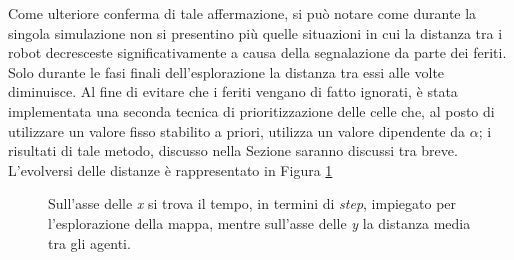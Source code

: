 Come ulteriore conferma di tale affermazione, si può notare come durante la singola simulazione non si presentino più quelle situazioni in cui la distanza tra i robot decresceste significativamente a causa della segnalazione da parte dei feriti. Solo durante le fasi finali dell'esplorazione la distanza tra essi alle volte diminuisce.
Al fine di evitare che i feriti vengano di fatto ignorati, è stata implementata una seconda tecnica di prioritizzazione delle celle che, al posto di utilizzare un valore fisso stabilito a priori, utilizza un valore dipendente da $\alpha$; i risultati di tale metodo, discusso nella Sezione  saranno discussi tra breve.
L'evolversi delle distanze è rappresentato in Figura \ref{fig:gammaHSim}
\begin{figure}
	\hfill
	\caption{Sull'asse delle \textit{x} si trova il tempo, in termini di \textit{step}, impiegato per l'esplorazione della mappa, mentre sull'asse delle \textit{y} la distanza media tra gli agenti.}
	\label{fig:gammaHSim}
\end{figure}
